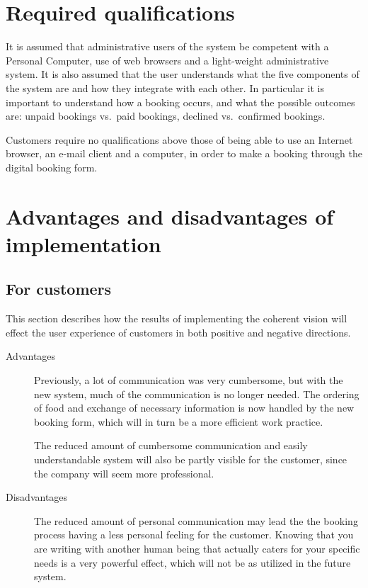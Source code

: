 \section{Required qualifications}
It is assumed that administrative users of the system  be competent with a Personal Computer, 
use of web browsers and a light-weight administrative system. It is also assumed that the
user understands what the five components of the system are and
how they integrate with each other. In particular it is important to understand
how a booking occurs, and what the possible outcomes are: unpaid bookings vs.\ 
paid bookings, declined vs.\ confirmed bookings.

Customers require no qualifications above those of being able to use an Internet
browser, an e-mail client and a computer, in order to make a booking through the 
digital booking form.

\section{Advantages and disadvantages of implementation}
\subsection{For customers}
This section describes how the results of implementing the coherent vision will 
effect the user experience of customers in both positive and negative 
directions.

\begin{description}
\item[Advantages]
Previously, a lot of communication was very cumbersome, but 
with the new system, much of the communication is no longer needed. The 
ordering of food and exchange of necessary information is now handled by the 
new booking form, which will in turn be a more efficient work practice.

The reduced amount of cumbersome communication and easily understandable system
will also be partly visible for the customer, since the company will seem more
professional.

\item[Disadvantages]
The reduced amount of personal communication may lead the the booking process having
a less personal feeling for the customer. Knowing that you are writing with
another human being that actually caters for your specific needs is a very 
powerful effect, which will not be as utilized in the future system. 
\end{description}

